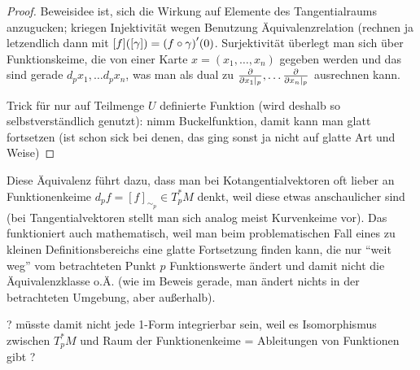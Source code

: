\documentclass[../H_Analysis_main.tex]{subfiles}
\begin{document}
\begin{proof}
Beweisidee ist, sich die Wirkung auf Elemente des Tangentialraums anzugucken; kriegen Injektivität wegen Benutzung Äquivalenzrelation (rechnen ja letzendlich dann mit $[f]\qty([\gamma]) = \qty(f \circ \gamma)'(0)$. Surjektivität überlegt man sich über Funktionskeime, die von einer Karte $x = (x_1, \dots, x_n)$ gegeben werden und das sind gerade $d_p x_1, \dots d_p x_n$, was man als dual zu $\pdv{x_1 \mid_p}, \dots \pdv{x_n \mid_p}$ ausrechnen kann.


Trick für nur auf Teilmenge $U$ definierte Funktion (wird deshalb so selbstverständlich genutzt): nimm Buckelfunktion, damit kann man glatt fortsetzen (ist schon sick bei denen, das ging sonst ja nicht auf glatte Art und Weise)
\end{proof}


Diese Äquivalenz führt dazu, dass man bei Kotangentialvektoren oft lieber an Funktionenkeime $d_p f = [f]_{\sim_p} \in T^*_p M$ denkt, weil diese etwas anschaulicher sind (bei Tangentialvektoren stellt man sich analog meist Kurvenkeime vor). Das funktioniert auch mathematisch, weil man beim problematischen Fall eines zu kleinen Definitionsbereichs eine glatte Fortsetzung finden kann, die nur \enquote{weit weg} vom betrachteten Punkt $p$ Funktionswerte ändert und damit nicht die Äquivalenzklasse o.Ä. (wie im Beweis gerade, man ändert nichts in der betrachteten Umgebung, aber außerhalb).

? müsste damit nicht jede 1-Form integrierbar sein, weil es Isomorphismus zwischen $T_p^*M$ und Raum der Funktionenkeime = Ableitungen von Funktionen gibt ?
\end{document}
